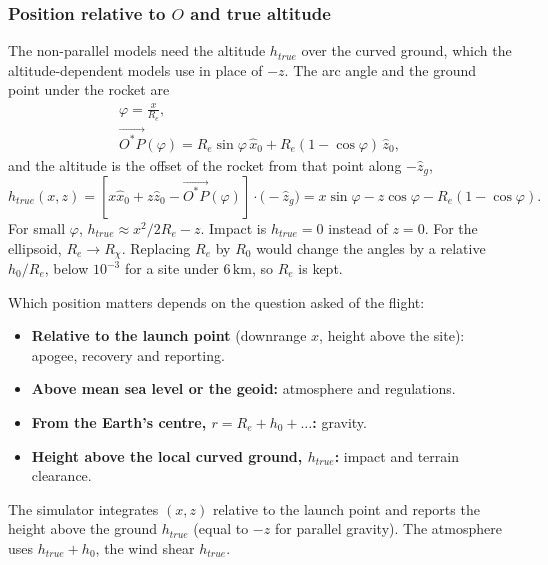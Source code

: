 \subsubsection{Position relative to $O$ and true altitude}\label{sec:position_altitude}
The non-parallel models need the altitude $h_{true}$ over the curved ground, which the
altitude-dependent models use in place of $-z$. The arc angle and the ground point under the
rocket are
\begin{gather}
    \varphi = \frac{x}{R_e}, \label{eq:phi_downrange}\\
    \vec{O^*P}(\varphi) = R_e\sin\varphi\,\hat{x}_0 + R_e(1-\cos\varphi)\,\hat{z}_0,
        \label{eq:surface_point}
\end{gather}
and the altitude is the offset of the rocket from that point along $-\hat{z}_g$,
\begin{equation} \label{eq:h_true}
    h_{true}(x,z) = \left[x\hat{x}_0+z\hat{z}_0-\vec{O^*P}(\varphi)\right]\cdot\bigl(-\hat{z}_g\bigr)
        = x\sin\varphi - z\cos\varphi - R_e(1-\cos\varphi).
\end{equation}
For small $\varphi$, $h_{true}\approx x^2/2R_e-z$. Impact is $h_{true}=0$ instead of $z=0$. For the
ellipsoid, $R_e\to R_\chi$. Replacing $R_e$ by $R_0$ would change the angles by a relative
$h_0/R_e$, below $10^{-3}$ for a site under $6\,\mathrm{km}$, so $R_e$ is kept.

Which position matters depends on the question asked of the flight:
\begin{itemize}
    \item \textbf{Relative to the launch point} (downrange $x$, height above the site): apogee,
    recovery and reporting.
    \item \textbf{Above mean sea level or the geoid:} atmosphere and regulations.
    \item \textbf{From the Earth's centre, $r=R_e+h_0+\dots$:} gravity.
    \item \textbf{Height above the local curved ground, $h_{true}$:} impact and terrain clearance.
\end{itemize}
The simulator integrates $(x,z)$ relative to the launch point and reports the height above the
ground $h_{true}$ (equal to $-z$ for parallel gravity). The atmosphere uses $h_{true}+h_0$, the
wind shear $h_{true}$.

